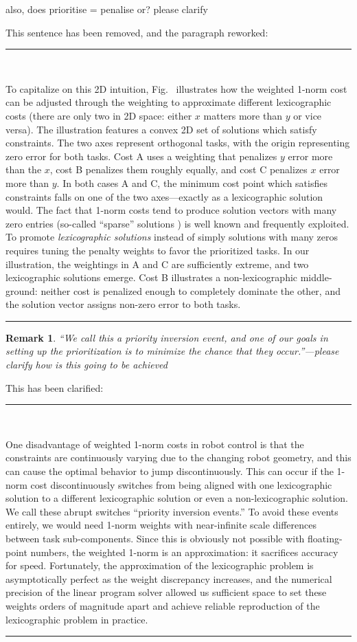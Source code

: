 \documentclass[10pt,letterpaper]{letter}
\renewcommand*{\ref}[1]{\zref{#1}}
\newcommand*{\ta}[1]{\textcolor[HTML]{107f10}{#1}}
\newcounter{reviewer}
\newtheorem{rev}{Remark}[reviewer]
\newcommand{\reviewer}[1]{\begin{rev} #1\end{rev}}
\newcommand{\response}[1]{\par{\hfill\begin{minipage}{\dimexpr\textwidth-2cm} #1\end{minipage}}}
\newcommand{\paperquote}[1]{%
	\begin{center}
		
		\begin{minipage}{.8\textwidth}
			{\rule{\textwidth}{.5pt}}\vspace{.5em}\\
			\begin{minipage}{\textwidth}\setlength{\parindent}{2em}#1\end{minipage}
			\vspace{.5em}
			{\rule{\textwidth}{.5pt}}
		\end{minipage}%
	\end{center}
}
\begin{document}
\begin{letter}{}
{	also, does
	prioritise = penalise or?
	please clarify}
\response{This sentence has been removed, and the paragraph reworked:}
\paperquote{
To capitalize on this 2D intuition, Fig.~\ref{fig:onpwbc} illustrates how the weighted 1-norm cost can be adjusted through the weighting to approximate different lexicographic costs (there are only two in 2D space\ta{: either $x$ matters more than $y$ or vice versa}). The illustration features a convex 2D set of solutions which satisfy constraints. The two axes represent orthogonal tasks, with the origin representing \ta{zero error for} both tasks. Cost A uses a weighting that penalizes $y$ error more than the $x$, cost B penalizes them roughly equally\ta{, and cost C penalizes $x$ error more than $y$}. In both cases \ta{A and C}, the minimum cost point which satisfies constraints \ta{falls on one of the two axes---exactly as a lexicographic solution would.} The fact that 1-norm costs tend to produce \ta{solution vectors with many zero entries (so-called ``sparse'' solutions \cite{CandesWakinBoyd2008JFAA}) is well known and frequently exploited. To promote \emph{lexicographic solutions} instead of simply solutions with many zeros requires tuning the penalty weights to favor the prioritized tasks.} 
In our illustration, \ta{the weightings in A and C are sufficiently extreme, and two lexicographic solutions emerge}.
Cost B illustrates \ta{a non-lexicographic middle-ground: neither cost is penalized enough to completely dominate the other, and the solution vector assigns non-zero error to both tasks.}
}

\reviewer{``We call this a priority inversion event, and one of our goals in setting up the prioritization is to minimize the chance that they occur.''---please clarify how is this going to be achieved}
\response{This has been clarified:}
\paperquote{
One disadvantage of weighted 1-norm costs in robot control is that the constraints are continuously varying due to the changing robot geometry, and this can cause the optimal behavior to jump discontinuously.
This can occur if the 1-norm cost discontinuously switches from being aligned with one lexicographic solution to a different lexicographic solution or even a non-lexicographic solution.
\ta{We call these abrupt switches ``priority inversion events.'' To avoid these events entirely, we would need 1-norm weights with near-infinite scale differences between task sub-components. Since this is obviously not possible with floating-point numbers, the weighted 1-norm is an approximation: it sacrifices accuracy for speed.}
Fortunately, the approximation of the lexicographic problem is asymptotically perfect as the weight discrepancy increases, and the numerical precision of the linear program solver allowed us sufficient space to set these weights orders of magnitude apart and achieve reliable reproduction of the lexicographic problem in practice.
}


\end{letter}
\end{document}
